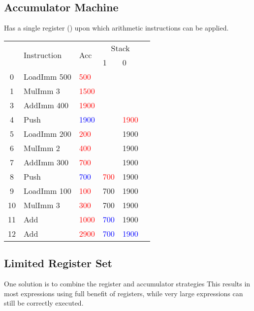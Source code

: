 \documentclass{report}
\newcommand{\hot}[1]{\textcolor{red}{#1}}
\newcommand{\old}[1]{\textcolor{blue}{#1}}
\begin{document}
        \subsection*{Accumulator Machine}
            Has a single register () upon which arithmetic instructions can be applied.
            \begin{center}
                \begin{tabular}{c l | l l l | l}
                    & \multirow{2}{*}{Instruction} & \multirow{2}{*}{Acc} &\multicolumn{2}{c}{Stack} \\
                    & & & 1 & 0 \\
                    \hline
                    0 &LoadImm 500  & \hot{500}&         &           \\
                    1 &MulImm 3     &\hot{1500}&         &           \\
                    3 &AddImm 400   &\hot{1900}&         &           \\
                    4 &Push         &\old{1900}&         &\hot{1900} \\
                    5 &LoadImm 200  & \hot{200}&         &      1900 \\
                    6 &MulImm 2     & \hot{400}&         &      1900 \\
                    7 &AddImm 300   & \hot{700}&         &      1900 \\
                    8 &Push         & \old{700}&\hot{700}&      1900 \\
                    9 &LoadImm 100  & \hot{100}&      700&      1900 \\
                   10 &MulImm 3     & \hot{300}&      700&      1900 \\
                   11 &Add          &\hot{1000}&\old{700}&      1900 \\
                   12 &Add          &\hot{2900}&\old{700}&\old{1900} \\
                \end{tabular}
            \end{center}


        \subsection*{Limited Register Set}
            One solution is to combine the register and accumulator strategies
            This results in most expressions using full benefit of registers, while very large expressions can still be correctly executed.
        
        \
\end{document}
